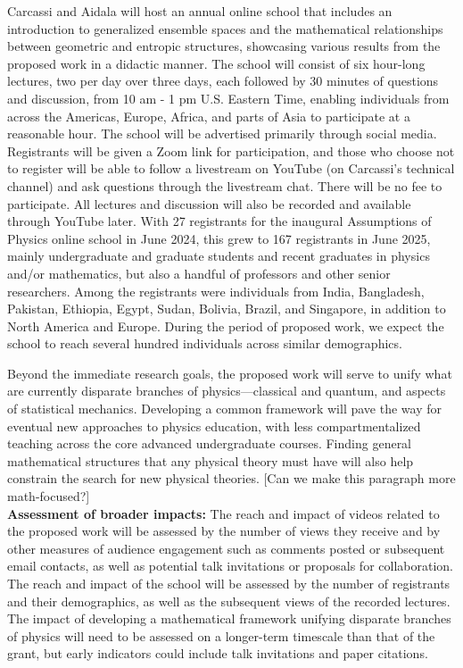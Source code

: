 Carcassi and Aidala will host an annual online school that includes an introduction to generalized ensemble spaces and the mathematical relationships between geometric and entropic structures, showcasing various results from the proposed work in a didactic manner.  The school will consist of six hour-long lectures, two per day over three days, each followed by 30 minutes of questions and discussion, from 10 am - 1 pm U.S. Eastern Time, enabling individuals from across the Americas, Europe, Africa, and parts of Asia to participate at a reasonable hour.  The school will be advertised primarily through social media.  Registrants will be given a Zoom link for participation, and those who choose not to register will be able to follow a livestream on YouTube (on Carcassi's technical channel) and ask questions through the livestream chat.  There will be no fee to participate.  All lectures and discussion will also be recorded and available through YouTube later. With 27 registrants for the inaugural Assumptions of Physics online school in June 2024, this grew to 167 registrants in June 2025, mainly undergraduate and graduate students and recent graduates in physics and/or mathematics, but also a handful of professors and other senior researchers.  Among the registrants were individuals from India, Bangladesh, Pakistan, Ethiopia, Egypt, Sudan, Bolivia, Brazil, and Singapore, in addition to North America and Europe. During the period of proposed work, we expect the school to reach several hundred individuals across similar demographics.    

Beyond the immediate research goals, the proposed work will serve to unify what are currently disparate branches of physics---classical and quantum, and aspects of statistical mechanics.  Developing a common framework will pave the way for eventual new approaches to physics education, with less compartmentalized teaching across the core advanced undergraduate courses.  Finding general mathematical structures that any physical theory must have will also help constrain the search for new physical theories.  [Can we make this paragraph more math-focused?]\\

\noindent
\textbf{Assessment of broader impacts:}  The reach and impact of videos related to the proposed work will be assessed by the number of views they receive and by other measures of audience engagement such as comments posted or subsequent email contacts, as well as potential talk invitations or proposals for collaboration.  The reach and impact of the school will be assessed by the number of registrants and their demographics, as well as the subsequent views of the recorded lectures.  The impact of developing a mathematical framework unifying disparate branches of physics will need to be assessed on a longer-term timescale than that of the grant, but early indicators could include talk invitations and paper citations. \\



